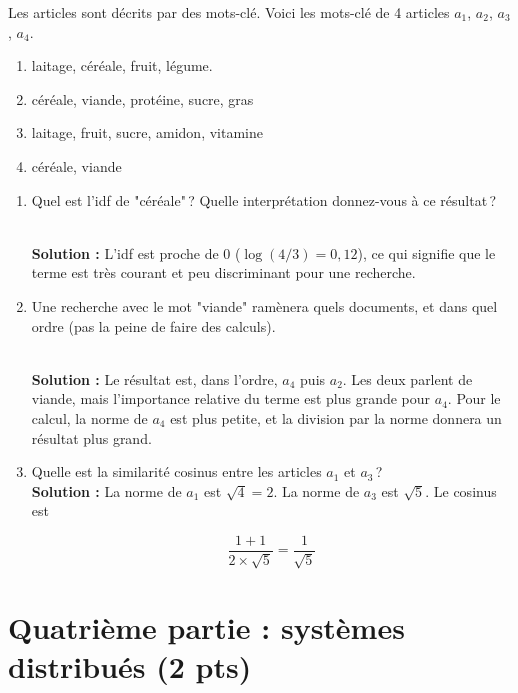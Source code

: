 \documentclass[11pt,a4paper]{article}
\newenvironment{solution}[0]{
~\\ \color{red} \textbf{Solution : }\color{black}}{%
}
\begin{document}
Les articles sont décrits par des mots-clé.
Voici les mots-clé de 4 articles $a_1$, $a_2$, $a_3$, $a_4$.

\begin{enumerate}
  \item laitage, céréale, fruit, légume.
  \item céréale, viande, protéine, sucre, gras 
  \item laitage, fruit, sucre, amidon, vitamine
  \item céréale, viande

\end{enumerate}

\smallskip

\begin{enumerate}
   \item Quel est l'idf de "céréale"\,? Quelle interprétation donnez-vous à ce résultat\,?

\begin{solution}
L'idf est proche de 0 ($\log (4/3) = 0,12$), ce qui signifie que le terme est très 
courant et peu discriminant pour une recherche.
\end{solution}

  \item Une recherche avec le mot "viande" ramènera quels documents, et dans quel ordre (pas la peine de faire des calculs).
    
\begin{solution}
Le résultat est, dans l'ordre,  $a_4$ puis $a_2$. Les deux parlent de viande, mais l'importance relative
du terme est plus grande pour $a_4$. Pour le calcul, la norme de  $a_4$ est plus petite, et la division par
la norme donnera un résultat plus grand.
\end{solution}

  \item Quelle est la similarité cosinus entre les articles $a_1$ et $a_3$\,?
\begin{solution}
La norme de $a_1$ est $\sqrt{4} = 2$. La norme de $a_3$ est $\sqrt{5}$. Le cosinus est

$$\frac{1 + 1}{2 \times \sqrt{5}} = \frac{1}{\sqrt{5}}$$ 
\end{solution}
  
  \end{enumerate}

\section*{Quatrième partie : systèmes distribués (2 pts)}
\end{document}
